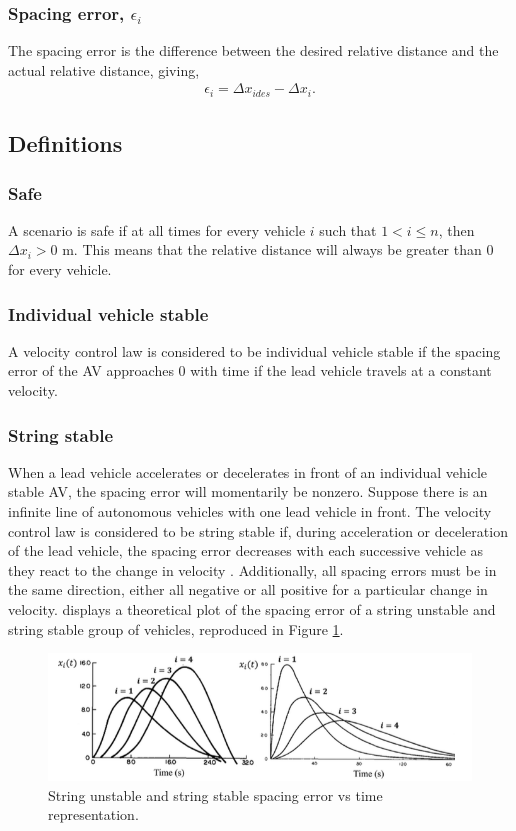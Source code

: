 \documentclass[conference]{IEEEtran}
\begin{document}
\subsubsection{Spacing error, $\epsilon_i$}
The spacing error is the difference between the desired relative distance and the actual relative distance, giving,
\begin{eqnarray}
\epsilon_i = \Delta x_{i des}-\Delta x_i.
\end{eqnarray}

\subsection{Definitions}
\subsubsection{Safe}
A scenario is safe if at all times for every vehicle $i$ such that $1<i\leq n$, then $\Delta x_i>0$ m. This means that the relative distance will always be greater than 0 for every vehicle.
\subsubsection{Individual vehicle stable}
A velocity control law is considered to be individual vehicle stable if the spacing error of the AV approaches 0 with time if the lead vehicle travels at a constant velocity.
\subsubsection{String stable}
When a lead vehicle accelerates or decelerates in front of an individual vehicle stable AV, the spacing error will momentarily be nonzero. Suppose there is an infinite line of autonomous vehicles with one lead vehicle in front. The velocity control law is considered to be string stable if, during acceleration or deceleration of the lead vehicle, the spacing error decreases with each successive vehicle as they react to the change in velocity \cite{rajamani2011vehicle}. Additionally, all spacing errors must be in the same direction, either all negative or all positive for a particular change in velocity. \cite{feng2019string} displays a theoretical plot of the spacing error of a string unstable and string stable group of vehicles, reproduced in Figure \ref{stringexample}.

\begin{figure}[htbp]
\centerline{\includegraphics[width=3 in]{stringexample}}
\caption{String unstable and string stable spacing error vs time representation.}
\label{stringexample}
\end{figure}
\end{document}
